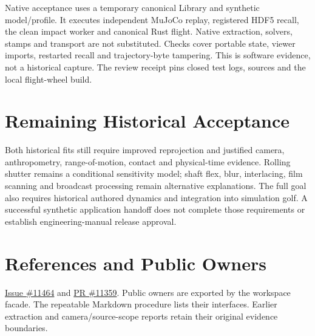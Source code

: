 \documentclass[11pt]{article}
\begin{document}
Native acceptance uses a temporary canonical Library and synthetic model/profile.
It executes independent MuJoCo replay, registered HDF5 recall, the clean impact
worker and canonical Rust flight. Native extraction, solvers, stamps and transport
are not substituted. Checks cover portable state, viewer imports, restarted recall
and trajectory-byte tampering. This is software evidence, not a historical capture.
The review receipt pins closed test logs, sources and the local flight-wheel build.

\section*{Remaining Historical Acceptance}
Both historical fits still require improved reprojection and justified camera,
anthropometry, range-of-motion, contact and physical-time evidence. Rolling
shutter remains a conditional sensitivity model; shaft flex, blur, interlacing,
film scanning and broadcast processing remain alternative explanations.
The full goal also requires historical authored dynamics and integration into
simulation golf. A successful synthetic application handoff does not complete
those requirements or establish engineering-manual release approval.

\section*{References and Public Owners}
\href{https://github.com/D-sorganization/UpstreamDrift/issues/11464}{Issue \#11464}
and \href{https://github.com/D-sorganization/UpstreamDrift/pull/11359}{PR \#11359}.
Public owners are exported by the workspace facade. The repeatable Markdown
procedure lists their interfaces. Earlier extraction and camera/source-scope
reports retain their original evidence boundaries.
\end{document}
